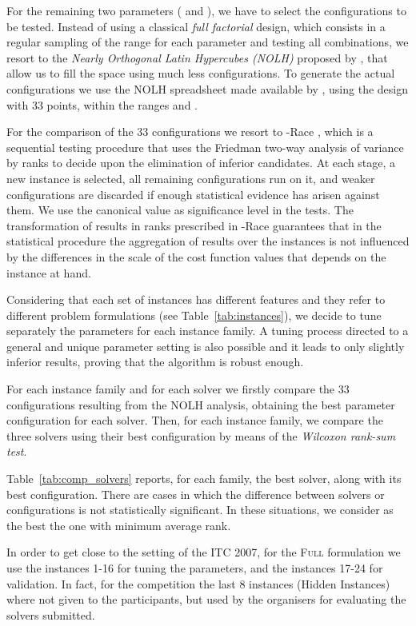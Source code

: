 \documentclass[authoryear,preprint,a4paper,12pt]{elsarticle}
\begin{document}
For the remaining two parameters ( and ), we have to select
the configurations to be tested. Instead of using a classical
\emph{full factorial} design, which consists in a regular sampling of the range for
each parameter and testing all combinations, we resort to the
\emph{Nearly Orthogonal Latin Hypercubes (NOLH)} proposed by
\citet{CiLu07}, that allow us to fill the space using much less
configurations. To generate the actual configurations we use the NOLH
spreadsheet made available by \citet{Sanc05}, using the design with 33
points, within the ranges  and .

For the comparison of the 33 configurations we resort to -Race
\citep{Bira05}, which is a sequential testing procedure
that uses the Friedman two-way analysis of variance by ranks to decide
upon the elimination of inferior candidates. At each stage, a new
instance is selected, all remaining configurations run on it, and weaker
configurations are discarded if enough statistical evidence has arisen
against them.  We use the canonical value  as significance level in the
tests.  The transformation of results in ranks prescribed in -Race
guarantees that in the statistical procedure the aggregation of
results over the instances is not influenced by the
differences in the scale of the cost function values that depends on the instance at hand.


Considering that each set of instances has different features and they
refer to different problem formulations (see
Table~\ref{tab:instances}), we decide to tune separately the
parameters for each instance family.
A tuning process directed to a general and unique parameter setting 
is also possible and it leads to only slightly inferior results, 
proving that the algorithm is robust enough. 

For each instance family and for each solver we firstly
compare the 33 configurations resulting from the NOLH analysis,
obtaining the best parameter configuration for each solver. Then, for
each instance family, we compare the three solvers using their best
configuration by means of the \emph{Wilcoxon rank-sum test}. 

Table~\ref{tab:comp_solvers} reports, for each family, the best
solver, along with its best configuration. There are cases in which
the difference between solvers or configurations is not statistically
significant. In these situations, we consider as the best the one with
minimum average rank.

In order to get close to the setting of the ITC 2007, for the
\textsc{Full} formulation we use the instances 1-16 for tuning the
parameters, and the instances 17-24 for validation. In fact, for the
competition the last 8 instances (Hidden Instances) where not given to
the participants, but used by the organisers for evaluating the
solvers submitted.
\end{document}
